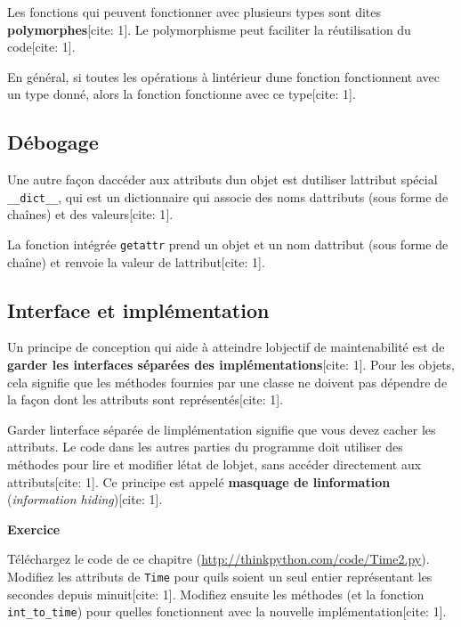Les fonctions qui peuvent fonctionner avec plusieurs types sont dites
\textbf{polymorphes}{[}cite: 1{]}. Le polymorphisme peut faciliter la
réutilisation du code{[}cite: 1{]}.

En général, si toutes les opérations à l\textquotesingle intérieur
d\textquotesingle une fonction fonctionnent avec un type donné, alors la
fonction fonctionne avec ce type{[}cite: 1{]}.

\hypertarget{duxe9bogage}{%
\subsection{Débogage}\label{duxe9bogage}}

Une autre façon d\textquotesingle accéder aux attributs
d\textquotesingle un objet est d\textquotesingle utiliser
l\textquotesingle attribut spécial \texttt{\_\_dict\_\_}, qui est un
dictionnaire qui associe des noms d\textquotesingle attributs (sous
forme de chaînes) et des valeurs{[}cite: 1{]}.

La fonction intégrée \texttt{getattr} prend un objet et un nom
d\textquotesingle attribut (sous forme de chaîne) et renvoie la valeur
de l\textquotesingle attribut{[}cite: 1{]}.

\hypertarget{interface-et-impluxe9mentation}{%
\subsection{Interface et
implémentation}\label{interface-et-impluxe9mentation}}

Un principe de conception qui aide à atteindre
l\textquotesingle objectif de maintenabilité est de \textbf{garder les
interfaces séparées des implémentations}{[}cite: 1{]}. Pour les objets,
cela signifie que les méthodes fournies par une classe ne doivent pas
dépendre de la façon dont les attributs sont représentés{[}cite: 1{]}.

Garder l\textquotesingle interface séparée de
l\textquotesingle implémentation signifie que vous devez cacher les
attributs. Le code dans les autres parties du programme doit utiliser
des méthodes pour lire et modifier l\textquotesingle état de
l\textquotesingle objet, sans accéder directement aux attributs{[}cite:
1{]}. Ce principe est appelé \textbf{masquage de
l\textquotesingle information} (\emph{information hiding}){[}cite: 1{]}.

\textbf{Exercice}

Téléchargez le code de ce chapitre
(\url{http://thinkpython.com/code/Time2.py}). Modifiez les attributs de
\texttt{Time} pour qu\textquotesingle ils soient un seul entier
représentant les secondes depuis minuit{[}cite: 1{]}. Modifiez ensuite
les méthodes (et la fonction \texttt{int\_to\_time}) pour
qu\textquotesingle elles fonctionnent avec la nouvelle
implémentation{[}cite: 1{]}.


